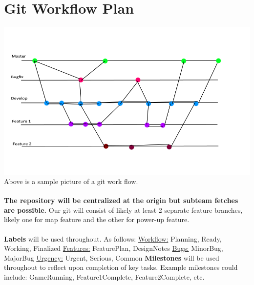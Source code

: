 \documentclass[12pt, titlepage]{article}
\begin{document}
\section {Git Workflow Plan}
\includegraphics[scale = 0.4]{Gitworkflow.png}
\\
Above is a sample picture of a git work flow. 
\\
\\
\textbf{The repository will be centralized at the origin but subteam fetches are possible.} Our git will consist of likely at least 2 separate feature branches, likely one for map feature and the other for power-up feature.
\\
\\
\textbf{Labels} will be used throughout. As follows: 
\newline
\newline
\underline{Workflow:}
\newline
Planning, Ready, Working, Finalized
\newline
\newline
\underline{Features:}
\newline
FeaturePlan, DesignNotes
\newline
\newline
\underline{Bugs:}
\newline
MinorBug, MajorBug
\newline
\newline
\underline{Urgency:}
\newline
Urgent, Serious, Common
\newline
\newline
\textbf{Milestones} will be used throughout to reflect upon completion of key tasks.
\newline
\newline
Example milestones could include:
\newline
GameRunning, Feature1Complete, Feature2Complete, etc.
\end{document}

